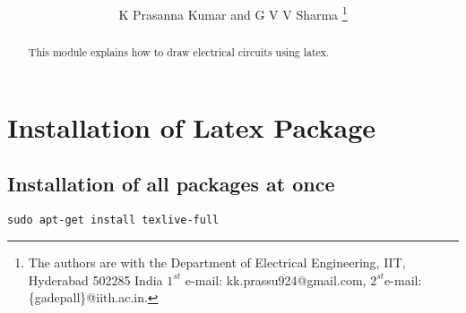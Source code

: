 \documentclass[journal,12pt,twocolumn]{IEEEtran}
\begin{document}

 
 

\title{
} 
 
%
%
%


\author{K Prasanna Kumar and G V V Sharma %
\thanks{The authors are with the Department
of Electrical Engineering, IIT, Hyderabad
502285 India $1^{st}$ e-mail: kk.prassu924@gmail.com, $2^{st}$e-mail: \{gadepall\}@iith.ac.in. 
}}


\maketitle


\tableofcontents

\bigskip
\begin{abstract}
This module explains how to draw electrical circuits using latex.
\end{abstract}
\section{Installation of Latex Package }
\subsection*{Installation of all packages at once}
\begin{lstlisting}
sudo apt-get install texlive-full
\end{lstlisting}
\end{document}
